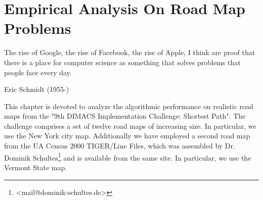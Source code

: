 %
%
%
%
%
%

\chapter{Empirical Analysis On Road Map Problems}
\label{chapEmpiricalAnalysisRoadMaps}
%
\begin{FraseCelebre}
\begin{Frase}
The rise of Google, the rise of Facebook, the rise of Apple, I think are proof that there is a place for computer science as something that solves problems that people face every day.
\end{Frase}
\begin{Fuente}
Eric Schmidt (1955-)
\end{Fuente}
\end{FraseCelebre}
%
%

This chapter is devoted to analyze the algorithmic performance on realistic road maps from the "9th DIMACS Implementation Challenge: Shortest Path". The challenge comprises a set of twelve road maps of increasing size. In particular, we use the New York city map. Additionally we have employed a second road map from the UA Census 2000 TIGER/Line Files, which was assembled by Dr. Dominik Schultes\footnote{<mail@dominik-schultes.de>} and is available from the same site. In particular, we use the Vermont State map.

